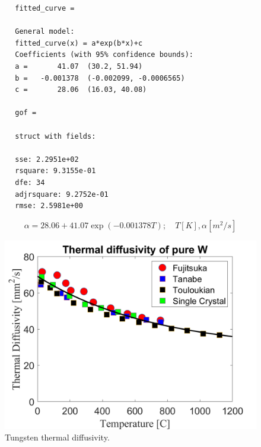 \documentclass[12pt]{article}
\begin{document}
	\begin{verbatim}
		fitted_curve = 
		
		General model:
		fitted_curve(x) = a*exp(b*x)+c
		Coefficients (with 95% confidence bounds):
		a =       41.07  (30.2, 51.94)
		b =   -0.001378  (-0.002099, -0.0006565)
		c =       28.06  (16.03, 40.08)
		
		gof = 
		
		struct with fields:
		
		sse: 2.2951e+02
		rsquare: 9.3155e-01
		dfe: 34
		adjrsquare: 9.2752e-01
		rmse: 2.5981e+00
	\end{verbatim}
	\begin{equation}
		\alpha=28.06+41.07\exp( -0.001378T); \quad T[K], \alpha [m^2/s]
	\end{equation}
	
	

\begin{figure}[h!]
	\centering
	\includegraphics[width=0.75\linewidth]{W_diffusivity}  
	\caption{Tungsten thermal diffusivity.}
	\label{fig:W_fab1}
\end{figure}
\end{document}
